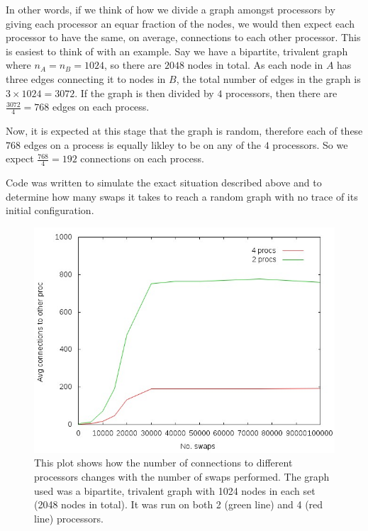 \documentclass[pdftex,12pt,a4paper]{article}
\begin{document}
In other words, if we think of how we divide a graph amongst processors by giving each processor an equar fraction of the nodes, we would then expect each processor to have the same, on average, connections to each other processor. This is easiest to think of with an example. Say we have a bipartite, trivalent graph where $n_A = n_B = 1024$, so there are $2048$ nodes in total. As each node in $A$ has three edges connecting it to nodes in $B$, the total number of edges in the graph is $3 \times 1024 = 3072$. If the graph is then divided by $4$ processors, then there are $\frac{3072}{4} = 768$ edges on each process.

Now, it is expected at this stage that the graph is random, therefore each of these $768$ edges on a process is equally likley to be on any of the $4$ processors. So we expect $\frac{768}{4} = 192$ connections on each process.

Code was written to simulate the exact situation described above and to determine how many swaps it takes to reach a random graph with no trace of its initial configuration.

\begin{figure}

\centering
\includegraphics[scale=0.8]{swap_random_1024_by_2_nodegraph.jpg}
\caption{This plot shows how the number of connections to different processors changes with the number of swaps performed. The graph used was a bipartite, trivalent graph with 1024 nodes in each set (2048 nodes in total). It was run on both 2 (green line) and 4 (red line) processors.}
\end{figure}
\end{document}
